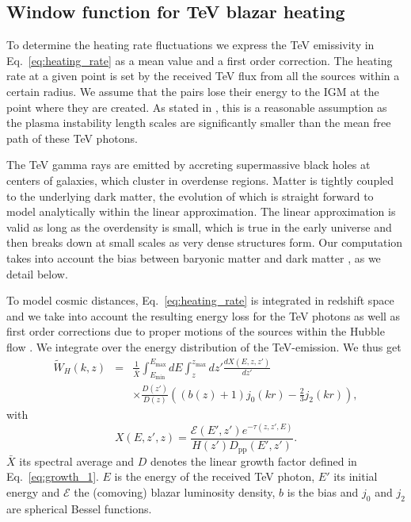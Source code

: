 \documentclass[numberedappendix]{emulateapj}
\begin{document}
\subsection{Window function for TeV blazar heating}\label{sec:window}
To determine the heating rate fluctuations we express the TeV emissivity in Eq.~\eqref{eq:heating_rate} as a mean value and a first order correction. The heating rate at a given point is set by the received TeV flux from all the sources within a certain radius. We assume that the pairs lose their energy to the IGM at the point where they are created. As stated in \citet{2012ApJ...752...22B}, this is a reasonable assumption as the plasma instability length scales are significantly smaller than the mean free path of these TeV photons.

The TeV gamma rays are emitted by accreting supermassive black holes at centers of galaxies, which cluster in overdense regions. Matter is tightly coupled to the underlying dark matter, the evolution of which is straight forward to model analytically within the linear approximation. The linear approximation is valid as long as the overdensity is small, which is true in the early universe and then breaks down at small scales as very dense structures form. Our computation takes into account the bias between baryonic matter and dark matter \citep{1996MNRAS.282..347M}, as we detail below.

To model cosmic distances, Eq.~\eqref{eq:heating_rate} is integrated in redshift space and we take into account the resulting energy loss for the TeV photons as well as first order corrections due to proper motions of the sources within the Hubble flow \citep{1987MNRAS.227....1K}. We integrate over the energy distribution of the TeV-emission. We thus get
\begin{eqnarray}
\label{eq:window}
\tilde{W}_H(k,z)&=&\frac{1}{\bar{X}}\int_{E_{\mathrm{min}}}^{E_{\mathrm{max}}}dE\int_z^{z_{\mathrm{max}}}dz'\frac{dX(E,z,z')}{dz'} \\
&&\times \frac{D(z')}{D(z)}\left((b(z)+1)j_0(kr)-\frac{2}{3}j_2(kr)\right), \nonumber
\end{eqnarray}
with
\begin{equation}
\label{eq:define_X}
X(E,z',z)=\frac{\mathcal{E}(E',z') e^{-\tau(z,z',E)}}{H(z') D_{\mathrm{pp}}(E',z')}.
\end{equation}
$\bar{X}$ its spectral average and $D$ denotes the linear growth factor defined in Eq.~\eqref{eq:growth_1}. $E$ is the energy of the received TeV photon, $E'$ its initial energy and $\mathcal{E}$ the (comoving) blazar luminosity density, $b$ is the bias and $j_0$ and $j_2$ are spherical Bessel functions.
\end{document}
